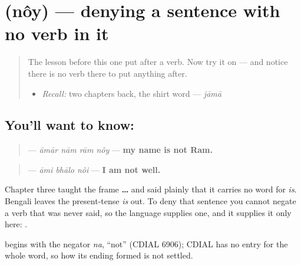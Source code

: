 \section[\texorpdfstring{\bn{নয়} (nôy)}{নয় (nôy)}]{ (nôy) — denying a sentence with no verb in it}

\label{lesson:BN-C16-noy}



\begin{quote}
The lesson before this one put \textbf{} after a verb. Now try it on \textbf{  } — and notice there is no verb there to put anything after.

\begin{itemize}
\raggedright
  \item \emph{Recall:} two chapters back, the shirt word — \emph{jāmā}
\end{itemize}
\end{quote}

\subsection*{You'll want to know: }
\begin{quote}
\textbf{   } — \emph{āmār nām rām nôy} — \textbf{my name is not Ram.}
\end{quote}

\begin{quote}
\textbf{  } — \emph{āmi bhālo nôi} — \textbf{I am not well.}
\end{quote}

Chapter three taught the frame \textbf{  …} and said plainly that it carries no word for \emph{is}. Bengali leaves the present-tense \emph{is} out. To deny that sentence you cannot negate a verb that was never said, so the language supplies one, and it supplies it only here: \textbf{}.

\begin{cousinweb}
\textbf{} begins with the negator \emph{na}, \textquotedblleft{}not\textquotedblright{} (CDIAL 6906); CDIAL has no entry for the whole word, so how its ending formed is not settled.
\end{cousinweb}

